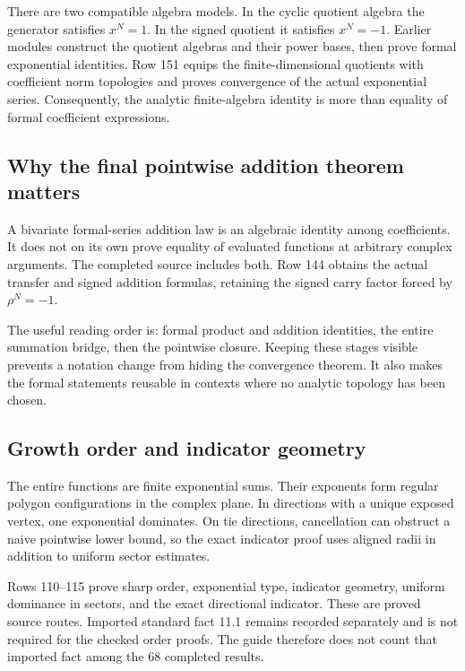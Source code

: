 There are two compatible algebra models. In the cyclic quotient algebra the generator satisfies $x^N=1$. In the signed quotient it satisfies $x^N=-1$. Earlier modules construct the quotient algebras and their power bases, then prove formal exponential identities. Row 151 equips the finite-dimensional quotients with coefficient norm topologies and proves convergence of the actual exponential series. Consequently, the analytic finite-algebra identity is more than equality of formal coefficient expressions.

\subsection{Why the final pointwise addition theorem matters}
A bivariate formal-series addition law is an algebraic identity among coefficients. It does not on its own prove equality of evaluated functions at arbitrary complex arguments. The completed source includes both. Row 144 obtains the actual transfer and signed addition formulas, retaining the signed carry factor forced by $\rho^N=-1$.

The useful reading order is: formal product and addition identities, the entire summation bridge, then the pointwise closure. Keeping these stages visible prevents a notation change from hiding the convergence theorem. It also makes the formal statements reusable in contexts where no analytic topology has been chosen.

\subsection{Growth order and indicator geometry}
The entire functions are finite exponential sums. Their exponents form regular polygon configurations in the complex plane. In directions with a unique exposed vertex, one exponential dominates. On tie directions, cancellation can obstruct a naive pointwise lower bound, so the exact indicator proof uses aligned radii in addition to uniform sector estimates.

Rows 110--115 prove sharp order, exponential type, indicator geometry, uniform dominance in sectors, and the exact directional indicator. These are proved source routes. Imported standard fact 11.1 remains recorded separately and is not required for the checked order proofs. The guide therefore does not count that imported fact among the 68 completed results.
